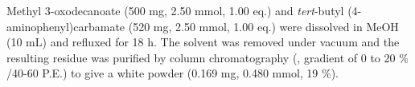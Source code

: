 Methyl 3-oxodecanoate  (500 mg, 2.50 mmol, 1.00 eq.) and \textit{tert}-butyl (4-aminophenyl)carbamate  (520 mg, 2.50 mmol, 1.00 eq.) were dissolved in MeOH (10 mL) and refluxed for 18 h. The solvent was removed under vacuum and the resulting residue was purified by column chromatography (, gradient of 0 to 20 \% /40-60 P.E.) to give a white powder (0.169 mg, 0.480 mmol, 19 \%).
\\[1\baselineskip]
\\[1\baselineskip]
\\[1\baselineskip]
\\[1\baselineskip]
